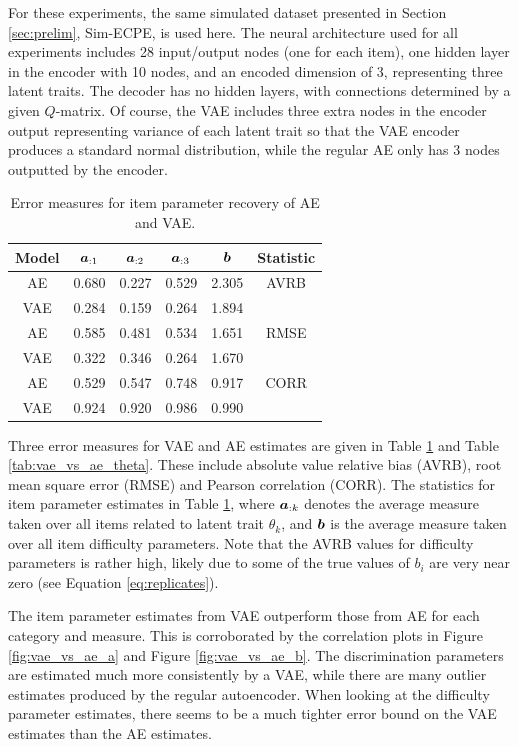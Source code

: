 For these experiments, the same simulated dataset presented in Section \ref{sec:prelim}, Sim-ECPE, is used here. The neural architecture used for all experiments includes 28 input/output nodes (one for each item), one hidden layer in the encoder with 10 nodes, and an encoded dimension of 3, representing three latent traits. The decoder has no hidden layers, with connections determined by a given $Q$-matrix. Of course, the VAE includes three extra nodes in the encoder output representing variance of each latent trait so that the VAE encoder produces a standard normal distribution, while the regular AE only has 3 nodes outputted by the encoder.

\begin{table}[h]
\centering
\begin{tabular}{cccccc}
\hline
Model   & $\boldsymbol{a}_{:1}$ & $\boldsymbol{a}_{:2}$ & $\boldsymbol{a}_{:3}$ & $\boldsymbol{b}$ & Statistic \\
      \hline
AE & 0.680 & 0.227 & 0.529 & 2.305 & AVRB \\
VAE   &0.284  & 0.159 & 0.264 & 1.894 &  \\
\hline
AE & 0.585 & 0.481 & 0.534 & 1.651 & RMSE \\
VAE   & 0.322 & 0.346 & 0.264 & 1.670 & \\
\hline
AE & 0.529 & 0.547 & 0.748 & 0.917 & CORR \\
VAE   & 0.924 & 0.920 & 0.986 & 0.990 & \\
\hline
\end{tabular}
\caption{Error measures for item parameter recovery of AE and VAE.}
\label{tab:vae_vs_ae_items}
\end{table}

Three error measures for VAE and AE estimates are given in Table \ref{tab:vae_vs_ae_items} and Table \ref{tab:vae_vs_ae_theta}. These include absolute value relative bias (AVRB), root mean square error (RMSE) and Pearson correlation (CORR). The statistics for item parameter estimates in Table \ref{tab:vae_vs_ae_items}, where $\boldsymbol{a}_{:k}$ denotes the average measure taken over all items related to latent trait $\theta_k$, and $\boldsymbol{b}$ is the average measure taken over all item difficulty parameters. Note that the AVRB values for difficulty parameters is rather high, likely due to some of the true values of $b_i$ are very near zero (see Equation \ref{eq:replicates}). 

The item parameter estimates from VAE outperform those from AE for each category and measure. This is corroborated by the correlation plots in Figure \ref{fig:vae_vs_ae_a} and Figure \ref{fig:vae_vs_ae_b}. The discrimination parameters are estimated much more consistently by a VAE, while there are many outlier estimates produced by the regular autoencoder. When looking at the difficulty parameter estimates, there seems to be a much tighter error bound on the VAE estimates than the AE estimates.

